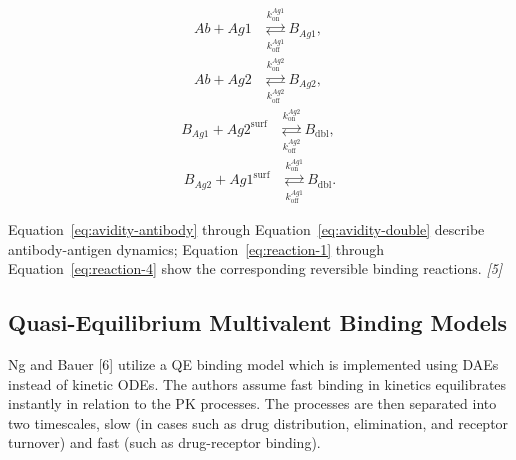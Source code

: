 \documentclass[11pt]{article}
\begin{document}
\begin{equation}
\begin{aligned}
Ab + Ag1
&\mathrel{\mathop{\rightleftarrows}\limits^{k_{\mathrm{on}}^{Ag1}}_{k_{\mathrm{off}}^{Ag1}}}
B_{Ag1}, \
\end{aligned}
\label{eq:reaction-1}
\end{equation}
\begin{equation}
\begin{aligned}
Ab + Ag2
&\mathrel{\mathop{\rightleftarrows}\limits^{k_{\mathrm{on}}^{Ag2}}_{k_{\mathrm{off}}^{Ag2}}}
B_{Ag2}, \
\end{aligned}
\label{eq:reaction-2}
\end{equation}
\begin{equation}
\begin{aligned}
B_{Ag1} + Ag2^{\mathrm{surf}}
&\mathrel{\mathop{\rightleftarrows}\limits^{k_{\mathrm{on}}^{Ag2}}_{k_{\mathrm{off}}^{Ag2}}}
B_{\mathrm{dbl}}, \
\end{aligned}
\label{eq:reaction-3}
\end{equation}
\begin{equation}
\begin{aligned}
B_{Ag2} + Ag1^{\mathrm{surf}}
&\mathrel{\mathop{\rightleftarrows}\limits^{k_{\mathrm{on}}^{Ag1}}_{k_{\mathrm{off}}^{Ag1}}}
B_{\mathrm{dbl}}.
\end{aligned}
\label{eq:reaction-4}
\end{equation}

Equation~\ref{eq:avidity-antibody} through Equation~\ref{eq:avidity-double} describe antibody-antigen dynamics; Equation~\ref{eq:reaction-1} through Equation~\ref{eq:reaction-4} show the corresponding reversible binding reactions. \emph{[5]}
\par\medskip

\subsection{Quasi-Equilibrium Multivalent Binding Models}

Ng and Bauer [6] utilize a QE binding model which is implemented using DAEs instead of kinetic ODEs. The authors assume fast binding in kinetics equilibrates instantly in relation to the PK processes. The processes are then separated into two timescales, slow (in cases such as drug distribution, elimination, and receptor turnover) and fast (such as drug-receptor binding).
\par\medskip
\end{document}
